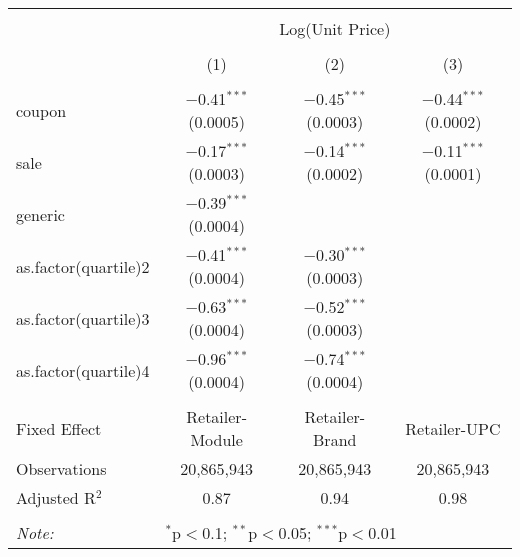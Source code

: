 
\begin{table}[!htbp] \centering 
  \caption{} 
  \label{tab:overallSavingsStorable} 
\begin{tabular}{@{\extracolsep{5pt}}lccc} 
\\[-1.8ex]\hline 
\hline \\[-1.8ex] 
 & \multicolumn{3}{c}{Log(Unit Price)} \\ 
\\[-1.8ex] & (1) & (2) & (3)\\ 
\hline \\[-1.8ex] 
 coupon & $-$0.41$^{***}$ (0.0005) & $-$0.45$^{***}$ (0.0003) & $-$0.44$^{***}$ (0.0002) \\ 
  sale & $-$0.17$^{***}$ (0.0003) & $-$0.14$^{***}$ (0.0002) & $-$0.11$^{***}$ (0.0001) \\ 
  generic & $-$0.39$^{***}$ (0.0004) &  &  \\ 
  as.factor(quartile)2 & $-$0.41$^{***}$ (0.0004) & $-$0.30$^{***}$ (0.0003) &  \\ 
  as.factor(quartile)3 & $-$0.63$^{***}$ (0.0004) & $-$0.52$^{***}$ (0.0003) &  \\ 
  as.factor(quartile)4 & $-$0.96$^{***}$ (0.0004) & $-$0.74$^{***}$ (0.0004) &  \\ 
 \hline \\[-1.8ex] 
Fixed Effect & Retailer-Module & Retailer-Brand & Retailer-UPC \\ 
Observations & 20,865,943 & 20,865,943 & 20,865,943 \\ 
Adjusted R$^{2}$ & 0.87 & 0.94 & 0.98 \\ 
\hline 
\hline \\[-1.8ex] 
\textit{Note:}  & \multicolumn{3}{l}{$^{*}$p$<$0.1; $^{**}$p$<$0.05; $^{***}$p$<$0.01} \\ 
\end{tabular} 
\end{table} 
